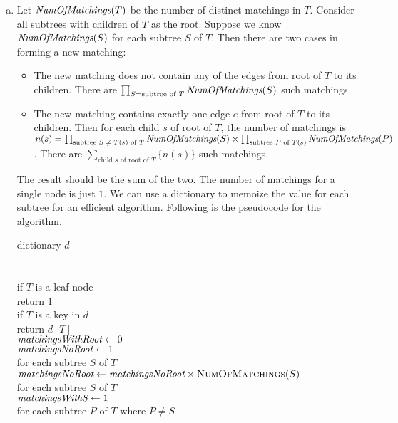 \documentclass[11pt]{article}
\begin{document}

\begin{solution}
\begin{enumerate}[(a)]
\item Let $\emph{NumOfMatchings}(T)$ be the number of distinct matchings in $T$. Consider all subtrees with children of $T$ as the root. Suppose we know $\emph{NumOfMatchings}(S)$ for each subtree $S$ of $T$. Then there are two cases in forming a new matching:
\begin{itemize}
\item The new matching does not contain any of the edges from root of $T$ to its children. There are $\prod_{\text{$S$=subtree of $T$}}{\emph{NumOfMatchings}(S)}$ such matchings.
\item The new matching contains exactly one edge $e$ from root of $T$ to its children. Then for each child $s$ of root of $T$, the number of matchings is\\
$n(s)=\prod_{\text{subtree $S \ne T(s)$ of $T$}}{\emph{NumOfMatchings}(S)}\times \prod_{\text{subtree $P$ of $T(s)$}}{\emph{NumOfMatchings}(P)}$. There are $\sum_{\text{child $s$ of root of $T$}}{\{n(s)\}}$ such matchings.
\end{itemize}
The result should be the sum of the two. The number of matchings for a single node is just $1$. We can use a dictionary to memoize the value for each subtree for an efficient algorithm. Following is the pseudocode for the algorithm.
\begin{algo}
	dictionary $d$
\\\\	\textsc{}\+
\\	if $T$ is a leaf node\+
\\	return $1$\-
\\	if $T$ is a key in $d$\+
\\	return $d[T]$\-
\\	$\emph{matchingsWithRoot}\gets 0$
\\	$\emph{matchingsNoRoot}\gets 1$
\\	for each subtree $S$ of $T$\+
\\	$\emph{matchingsNoRoot}\gets \emph{matchingsNoRoot}\times \textsc{NumOfMatchings}(S)$\-
\\	for each subtree $S$ of $T$\+
\\	$\emph{matchingsWithS}\gets 1$
\\	for each subtree $P$ of $T$ where $P\ne S$\+

\end{algo}
\end{enumerate}
\end{solution}
\end{document}
